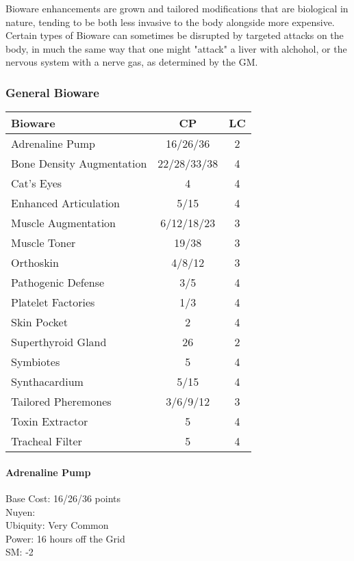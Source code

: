 \begin{multicols*}{3}
	Bioware enhancements are grown and tailored modifications that are biological in nature, tending to be both less invasive to the body alongside more expensive. Certain types of Bioware can sometimes be disrupted by targeted attacks on the body, in much the same way that one might "attack" a liver with alchohol, or the nervous system with a nerve gas, as determined by the GM.
	
	\subsubsection{General Bioware}
	
	\begin{center}
		\begin{adjustwidth}{-3mm}{}
		\begin{tabularx}{0.35\textwidth}{|X|c|c|}
			\hline
			Bioware & CP & LC\\
			\hline
			\hline
			Adrenaline Pump & 16/26/36 & 2 \\
			Bone Density Augmentation & 22/28/33/38 & 4 \\
			Cat's Eyes & 4 & 4 \\
			Enhanced Articulation & 5/15 & 4 \\
			Muscle Augmentation & 6/12/18/23 & 3 \\
			Muscle Toner & 19/38 & 3 \\
			Orthoskin & 4/8/12 & 3 \\
			Pathogenic Defense & 3/5 & 4 \\
			Platelet Factories & 1/3 & 4 \\
			Skin Pocket & 2 & 4 \\
			Superthyroid Gland & 26 & 2 \\
			Symbiotes & 5 & 4 \\
			Synthacardium & 5/15 & 4 \\
			Tailored Pheremones & 3/6/9/12 & 3 \\
			Toxin Extractor & 5 & 4 \\
			Tracheal Filter & 5 & 4 \\
			\hline
		\end{tabularx}
		\end{adjustwidth}
	\end{center}
	
	\paragraph{Adrenaline Pump}
	\begin{flushright}
		Base Cost: 16/26/36 points\\
		Nuyen: \\
		Ubiquity: Very Common\\
		Power: 16 hours off the Grid\\
		SM: -2\\
	\end{flushright}
	

\end{multicols*}
